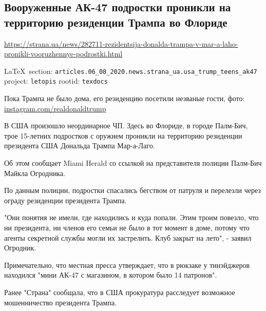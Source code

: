  
 
\subsection{Вооруженные АК-47 подростки проникли на территорию резиденции Трампа во Флориде}
\url{https://strana.ua/news/282711-rezidentsija-donalda-trampa-v-mar-a-laho-pronikli-vooruzhennye-podrostki.html}
  
\vspace{0.5cm}
 {\ifDEBUG\small\LaTeX~section: \verb|articles.06_08_2020.news.strana_ua.usa_trump_teens_ak47| project: \verb|letopis| rootid: \verb|texdocs|	\fi}
\vspace{0.5cm}


Пока Трампа не было дома, его резиденцию посетили незваные гости, фото:
\url{instagram.com/realdonaldtrump} 

В США произошло неординарное ЧП. Здесь во Флориде, в городе Палм-Бич, трое
15-летних подростков с оружием проникли на территорию резиденции президента США
Дональда Трампа Мар-а-Лаго.

Об этом сообщает Miami Herald со ссылкой на представителя полиции Палм-Бич
Майкла Огродника.

По данным полиции, подростки спасались бегством от патруля и перелезли через
ограду резиденции президента Трампа.

"Они понятия не имели, где находились и куда попали. Этим троим повезло, что ни
президента, ни членов его семьи не было в тот момент в доме, потому что агенты
секретной службы могли их застрелить. Клуб закрыт на лето", - заявил Огродник.
 
Примечательно, что местная пресса утверждает, что в рюкзаке у тинэйджеров
находился "мини АК-47 с магазином, в котором было 14 патронов".

Ранее "Страна" сообщала, что в США прокуратура расследует возможное
мошенничество президента Трампа.
